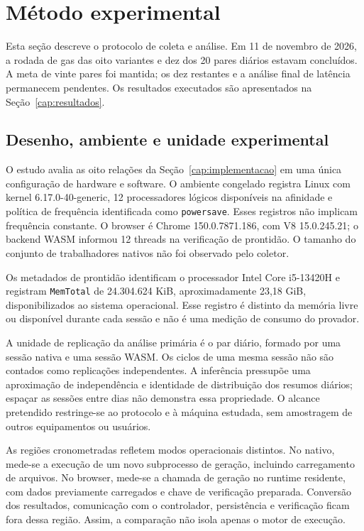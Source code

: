 \chapter{Método experimental}
\label{cap:metodo}

Esta seção descreve o protocolo de coleta e análise. Em 11 de novembro de 2026, a rodada de gas das oito variantes e dez dos 20 pares diários estavam concluídos. A meta de vinte pares foi mantida; os dez restantes e a análise final de latência permanecem pendentes. Os resultados executados são apresentados na Seção~\ref{cap:resultados}.

\section{Desenho, ambiente e unidade experimental}

O estudo avalia as oito relações da Seção~\ref{cap:implementacao} em uma única configuração de hardware e software. O ambiente congelado registra Linux com kernel 6.17.0-40-generic, 12 processadores lógicos disponíveis na afinidade e política de frequência identificada como \texttt{powersave}. Esses registros não implicam frequência constante. O browser é Chrome 150.0.7871.186, com V8 15.0.245.21; o backend WASM informou 12 threads na verificação de prontidão. O tamanho do conjunto de trabalhadores nativos não foi observado pelo coletor.

Os metadados de prontidão identificam o processador Intel Core i5-13420H e registram \texttt{MemTotal} de 24.304.624 KiB, aproximadamente 23,18 GiB, disponibilizados ao sistema operacional. Esse registro é distinto da memória livre ou disponível durante cada sessão e não é uma medição de consumo do provador.

A unidade de replicação da análise primária é o par diário, formado por uma sessão nativa e uma sessão WASM. Os ciclos de uma mesma sessão não são contados como replicações independentes. A inferência pressupõe uma aproximação de independência e identidade de distribuição dos resumos diários; espaçar as sessões entre dias não demonstra essa propriedade. O alcance pretendido restringe-se ao protocolo e à máquina estudada, sem amostragem de outros equipamentos ou usuários.

As regiões cronometradas refletem modos operacionais distintos. No nativo, mede-se a execução de um novo subprocesso de geração, incluindo carregamento de arquivos. No browser, mede-se a chamada de geração no runtime residente, com dados previamente carregados e chave de verificação preparada. Conversão dos resultados, comunicação com o controlador, persistência e verificação ficam fora dessa região. Assim, a comparação não isola apenas o motor de execução.

